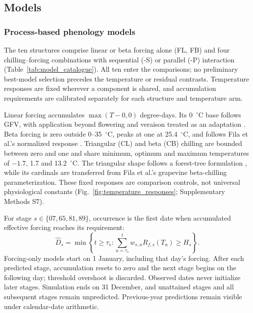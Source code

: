 \documentclass[a4paper,12pt]{article}
\let\OriginalSubsection\subsection
\renewcommand{\subsection}{\FloatBarrier\OriginalSubsection}
\let\OriginalSubsubsection\subsubsection
\renewcommand{\subsubsection}{\FloatBarrier\OriginalSubsubsection}
\begin{document}
\subsection{Models}

\subsubsection{Process-based phenology models}

The ten structures comprise linear or beta forcing alone (FL, FB) and four
chilling--forcing combinations with sequential (-S) or parallel (-P)
interaction (Table~\ref{tab:model_catalogue}). All ten enter the comparisons;
no preliminary best-model selection precedes the temperature or residual
contrasts. Temperature responses are fixed wherever a component is shared,
and accumulation requirements are calibrated separately for each structure
and temperature arm.

Linear forcing accumulates $\max(T-0,0)$ degree-days. Its 0~$^{\circ}$C base
follows GFV, with application beyond flowering and veraison treated as an
adaptation \citep{parkerGeneralPhenologicalModel2011a}. Beta forcing is zero
outside 0--35~$^{\circ}$C, peaks at one at 25.4~$^{\circ}$C, and follows
Fila et al.'s normalized response \citep{filaComparisonDifferentModelling2014}.
Triangular (CL) and beta (CB) chilling are bounded between zero and one and
share minimum, optimum and maximum temperatures of $-1.7$, 1.7 and
13.2~$^{\circ}$C. The triangular shape follows a forest-tree formulation
\citep{deWergifosseHETEROFOR2020}, while its cardinals are transferred from
Fila et al.'s grapevine beta-chilling parameterization. These fixed responses
are comparison controls, not universal physiological constants
(Fig.~\ref{fig:temperature_responses}; Supplementary Methods S7).

For stage $s\in\{07,65,81,89\}$, occurrence is the first date when accumulated
effective forcing reaches its requirement:
\begin{equation}
\widehat D_s=\min\left\{t\geq\tau_s:
\sum_{u=\tau_s}^{t}w_{s,u}R_{f,s}(T_u)\geq H_s\right\}.
\label{eq:stage_accumulation}
\end{equation}
Forcing-only models start on 1 January, including that day's forcing. After
each predicted stage, accumulation resets to zero and the next stage begins
on the following day; threshold overshoot is discarded. Observed dates never
initialize later stages. Simulation ends on 31 December, and unattained
stages and all subsequent stages remain unpredicted. Previous-year predictions
remain visible under calendar-date arithmetic.
\end{document}
